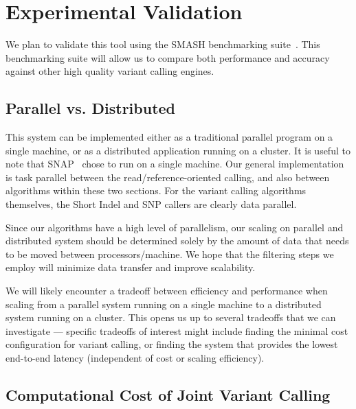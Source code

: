 \documentclass[11pt]{article}
\begin{document}
\section{Experimental Validation}
\label{sec:experimental-validation}

We plan to validate this tool using the SMASH benchmarking suite~\cite{talwalkar13}. This benchmarking suite will allow us to
compare both performance and accuracy against other high quality variant calling engines.

\subsection{Parallel vs. Distributed}
\label{sec:parallel-vs-distributed}

This system can be implemented either as a traditional parallel program on a single machine, or as a distributed application
running on a cluster. It is useful to note that SNAP~\cite{zaharia11} chose to run on a single machine. Our general implementation
is task parallel between the read/reference-oriented calling, and also between algorithms within these two sections. For the
variant calling algorithms themselves, the Short Indel and SNP callers are clearly data parallel.

Since our algorithms have a high level of parallelism, our scaling on parallel and distributed system should be determined solely
by the amount of data that needs to be moved between processors/machine. We hope that the filtering steps we employ will
minimize data transfer and improve scalability.

We will likely encounter a tradeoff between efficiency and performance when scaling from a parallel system running on a single
machine to a distributed system running on a cluster. This opens us up to several tradeoffs that we can investigate --- specific
tradeoffs of interest might include finding the minimal cost configuration for variant calling, or finding the system that provides
the lowest end-to-end latency (independent of cost or scaling efficiency).

\subsection{Computational Cost of Joint Variant Calling}
\label{sec:computational-cost-joint}
\end{document}
